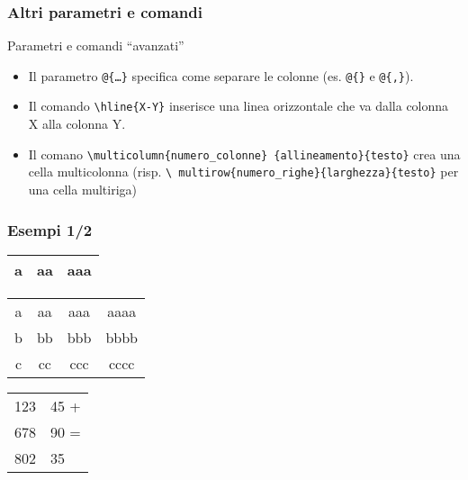\begin{frame}[fragile]
 
  \frametitle{Altri parametri e comandi}

  Parametri e comandi ``avanzati''
  
  \begin{itemize}
    \item Il parametro \texttt{@\{\dots\}} specifica come separare le colonne (es.
\texttt{@\{\}} e \texttt{@\{,\}}).
    \item Il comando \texttt{\textbackslash hline\{X-Y\}} inserisce una linea
orizzontale che va dalla colonna X alla colonna Y.
    \item Il comano \texttt{\textbackslash multicolumn\{numero\_colonne\}
\{allineamento\}\{testo\}} crea una cella multicolonna (risp. \texttt{\textbackslash
multirow\{numero\_righe\}\{larghezza\}\{testo\}} per una cella multiriga)
  \end{itemize}

\end{frame}

\begin{frame}
 
 \frametitle{Esempi 1/2}
  
  \begin{centering}

  \begin{tabular}{|p{}|l|p{2cm}|}
   \hline
   a & aa & aaa\\
   \hline
  \end{tabular}
  \vspace{1cm}

  \begin{tabular}{|c|c|c|c|}
   \hline
   a & aa & aaa & aaaa\\
   \cline{2-4}
   b & bb & bbb & bbbb\\
   \cline{3-4}
   c & cc & ccc & cccc\\
   \hline
  \end{tabular}
  \vspace{1cm}

  \begin{tabular}{l@{,}l@{}}
   123 & 45 + \\
   678 & 90 = \\
   \hline
   802 & 35
  \end{tabular}

  \end{centering}

\end{frame}
